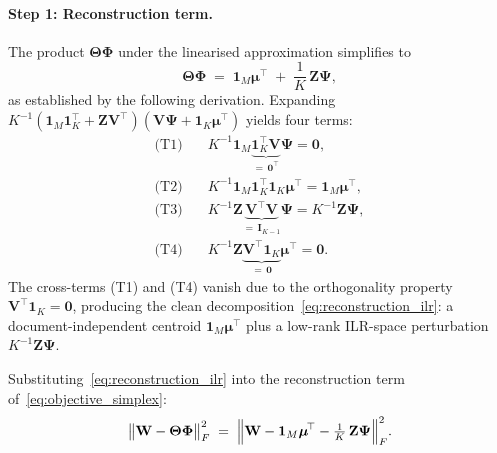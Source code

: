\paragraph{Step 1: Reconstruction term.}
The product $\boldsymbol{\Theta}\boldsymbol{\Phi}$ under the linearised
approximation simplifies to
\begin{equation}
  \boldsymbol{\Theta}\boldsymbol{\Phi}
  \;=\;
  \mathbf{1}_M\boldsymbol{\mu}^{\!\top}
  \;+\;
  \frac{1}{K}\,\mathbf{Z}\boldsymbol{\Psi},
  \label{eq:reconstruction_ilr}
\end{equation}
as established by the following derivation. Expanding
$K^{-1}(\mathbf{1}_M\mathbf{1}_K^{\!\top}
+ \mathbf{Z}\mathbf{V}^{\!\top})(\mathbf{V}\boldsymbol{\Psi}
+ \mathbf{1}_K\boldsymbol{\mu}^{\!\top})$ yields four terms:
\begin{align*}
  \text{(T1)}\quad
  &K^{-1}\mathbf{1}_M
   \underbrace{\mathbf{1}_K^{\!\top}\mathbf{V}}_{=\,\mathbf{0}^{\!\top}}
   \boldsymbol{\Psi}
   = \mathbf{0}, \\
  \text{(T2)}\quad
  &K^{-1}\mathbf{1}_M\mathbf{1}_K^{\!\top}\mathbf{1}_K
   \boldsymbol{\mu}^{\!\top}
   = \mathbf{1}_M\boldsymbol{\mu}^{\!\top}, \\
  \text{(T3)}\quad
  &K^{-1}\mathbf{Z}
   \underbrace{\mathbf{V}^{\!\top}\mathbf{V}}_{=\,\mathbf{I}_{K-1}}
   \boldsymbol{\Psi}
   = K^{-1}\mathbf{Z}\boldsymbol{\Psi}, \\
  \text{(T4)}\quad
  &K^{-1}\mathbf{Z}
   \underbrace{\mathbf{V}^{\!\top}\mathbf{1}_K}_{=\,\mathbf{0}}
   \boldsymbol{\mu}^{\!\top}
   = \mathbf{0}.
\end{align*}
The cross-terms (T1) and (T4) vanish due to the orthogonality property
$\mathbf{V}^{\!\top}\mathbf{1}_K=\mathbf{0}$, producing the clean
decomposition~\eqref{eq:reconstruction_ilr}: a document-independent
centroid $\mathbf{1}_M\boldsymbol{\mu}^{\!\top}$ plus a low-rank
ILR-space perturbation $K^{-1}\mathbf{Z}\boldsymbol{\Psi}$.

Substituting~\eqref{eq:reconstruction_ilr} into the reconstruction
term of~\eqref{eq:objective_simplex}:
\begin{equation}
  \bigl\|\mathbf{W}
    - \boldsymbol{\Theta}\boldsymbol{\Phi}\bigr\|_F^2
  \;=\;
  \Bigl\|\mathbf{W}
    - \mathbf{1}_M\boldsymbol{\mu}^{\!\top}
    - \tfrac{1}{K}\,\mathbf{Z}\boldsymbol{\Psi}
  \Bigr\|_F^2.
  \label{eq:recon_ilr}
\end{equation}

